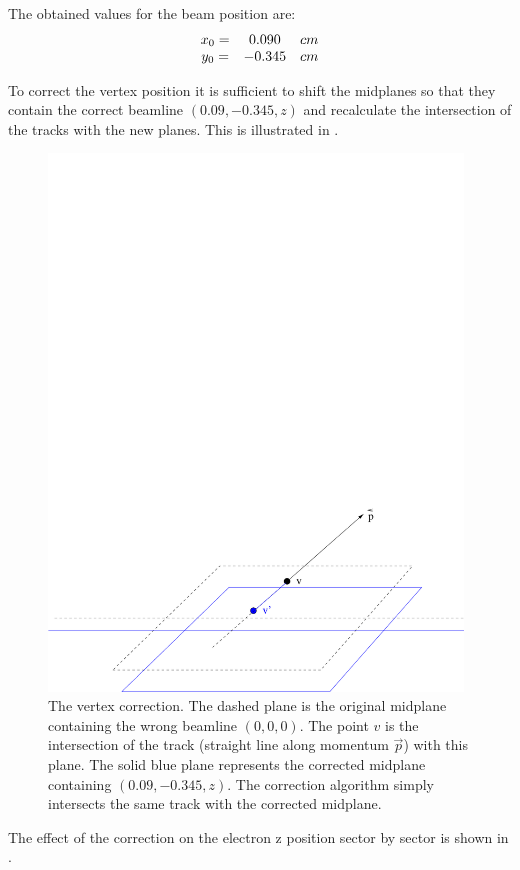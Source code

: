 \cia
The obtained values \cite{bib:valeri2}  for the beam position are:
$$
\begin{array}{c c c}
 x_0 = & 0.090   & cm \\
 y_0 = & -0.345 & cm
\end{array}
$$



To correct the vertex position it is sufficient to shift the midplanes 
so that they contain the correct beamline $(0.09, -0.345, z)$ and recalculate the intersection of the tracks
with the new planes. 
This is illustrated in .

\begin{figure}[h]
 \begin{center}
  \includegraphics[width=11cm, bb=50 -30 650 360]{data_reduction/img/vertex}
  \caption[The vertex correction]
          { The vertex correction. The dashed plane is the original midplane containing 
	             the wrong beamline $(0, 0, 0)$. The point $v$ is the intersection of the track 
		     (straight line along momentum $\vec p$) with this plane.
		     The solid blue plane represents the corrected midplane containing $(0.09, -0.345, z)$.
		     The correction algorithm simply intersects the same track with the corrected 
		     midplane.}
 \label{fig:vertex}
  \end{center}
\end{figure}
\cia
The effect of the correction on the electron z position sector by sector is shown in .

